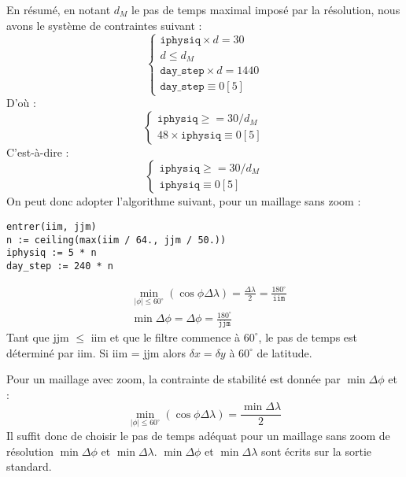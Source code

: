 \documentclass[a4paper,english,french]{article}
\begin{document}
En résumé, en notant $d_M$ le pas de temps maximal imposé par la
résolution, nous avons le système de contraintes suivant :
\begin{displaymath}
  \left\{
    \begin{array}{l}
      \mathtt{iphysiq} \times d = 30 \\
      d \le d_M \\
      \mathtt{day\_step} \times d = 1440 \\
      \mathtt{day\_step} \equiv 0[5]
    \end{array}
  \right.
\end{displaymath}
D'où :
\begin{displaymath}
  \left\{
    \begin{array}{l}
      \mathtt{iphysiq} \ge = 30 / d_M \\
      48 \times \mathtt{iphysiq} \equiv 0[5]
    \end{array}
  \right.
\end{displaymath}
C'est-à-dire :
\begin{displaymath}
  \left\{
    \begin{array}{l}
      \mathtt{iphysiq} \ge = 30 / d_M \\
      \mathtt{iphysiq} \equiv 0[5]
    \end{array}
  \right.
\end{displaymath}
On peut donc adopter l'algorithme suivant, pour un maillage sans zoom :
\begin{verbatim}
entrer(iim, jjm)
n := ceiling(max(iim / 64., jjm / 50.))
iphysiq := 5 * n
day_step := 240 * n
\end{verbatim}
\begin{align*}
  & \min_{|\phi| \le 60^\circ} (\cos \phi \Delta \lambda)
  = \frac{\Delta \lambda}{2} = \frac{180^\circ}{\mathtt{iim}} \\
  & \min \Delta \phi = \Delta \phi = \frac{180^\circ}{\mathtt{jjm}}
\end{align*}
Tant que jjm $\le$ iim et que le filtre commence à $60^\circ$, le pas de
temps est déterminé par iim. Si iim = jjm alors $\delta x = \delta y$
à $60^\circ$ de latitude.

Pour un maillage avec zoom, la contrainte de stabilité est donnée par
$\min \Delta \phi$ et :
\begin{equation*}
  \min_{|\phi| \le 60^\circ} (\cos \phi \Delta \lambda)
  = \frac{\min \Delta \lambda}{2}
\end{equation*}
Il suffit donc de choisir le pas de temps adéquat pour un maillage sans
zoom de résolution $\min \Delta \phi$ et $\min \Delta \lambda$. $\min
\Delta \phi$ et $\min \Delta \lambda$ sont écrits sur la sortie
standard.
\end{document}
